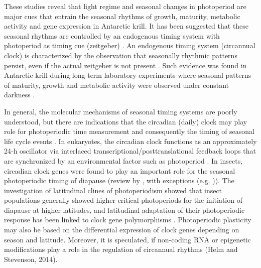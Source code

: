 These studies reveal that light regime and seasonal changes in photoperiod are
major cues that entrain the seasonal rhythms of growth, maturity, metabolic
activity and gene expression in Antarctic krill. It has been suggested that
these seasonal rhythms are controlled by an endogenous timing system with
photoperiod as timing cue (zeitgeber) \citep{brown_flexible_2011, brown_long-term_2013, piccolin_photoperiodic_2018}. An endogenous timing system (circannual clock) is characterized by
the observation that seasonally rhythmic patterns persist, even if the actual
zeitgeber is not present \citep{visser_phenology_2010}. Such evidence was found in
Antarctic krill during long-term laboratory experiments where seasonal patterns
of maturity, growth and metabolic activity were observed under constant
darkness \citep{brown_flexible_2011, piccolin_photoperiodic_2018}.

In general, the molecular mechanisms of seasonal timing systems are poorly
understood, but there are indications that the circadian (daily) clock may play
role for photoperiodic time measurement and consequently the timing of seasonal
life cycle events \citep{helm_annual_2013}. In eukaryotes, the circadian clock
functions as an approximately 24-h oscillator via interlaced
transcriptional/posttranslational feedback loops that are synchronized by an
environmental factor such as photoperiod \citep{mackey_biological_2007}. In insects, circadian
clock genes were found to play an important role for the seasonal photoperiodic
timing of diapause (review by \citet{goto_roles_2013, meuti_evolutionary_2013, meuti_functional_2015}, with exceptions (e.g. \citet{emerson_evolution_2009})). The investigation of
latitudinal clines of photoperiodism showed that insect populations generally
showed higher critical photoperiods for the initiation of diapause at higher
latitudes, and latitudinal adaptation of their photoperiodic response has been
linked to clock gene polymorphisms \citep{hut_latitudinal_2013}. Photoperiodic plasticity
may also be based on the differential expression of clock genes \citep{hodkova_period_2003} depending on season and latitude. Moreover, it is speculated, if
non-coding RNA or epigenetic modifications play a role in the regulation of
circannual rhythms (Helm and Stevenson, 2014).

